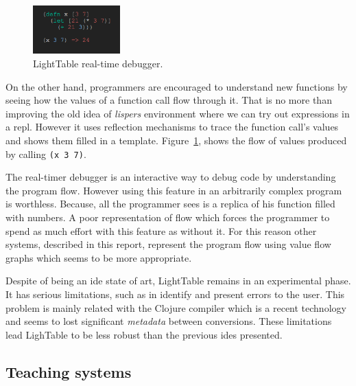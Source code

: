 \begin{figure}
  \vspace{-25pt}
  \begin{center}
    \includegraphics[width=0.3\textwidth]{img/eval-close}
  \end{center}
  \vspace{-20pt}
 \caption{LightTable real-time debugger.}  
  \vspace{-20pt}
    \label{fig:lt2}
\end{figure}

On the other hand, programmers are encouraged to understand new functions by seeing how the values of a function call flow through it. That is no more than improving the old idea of \textit{lispers} environment where we can try out expressions in a \ac{repl}. However it uses reflection mechanisms to trace the function call's values and shows them filled in a template. Figure~\ref{fig:lt2}, shows the flow of values produced by calling \texttt{(x 3 7)}.

The real-timer debugger is an interactive way to debug code by understanding the program flow. However using this feature in an arbitrarily complex program is worthless. Because, all the programmer sees is a replica of his function filled with numbers. A poor representation of flow which forces the programmer to spend as much effort with this feature as without it. For this reason other systems, described in this report, represent the program flow using value flow graphs which seems to be more appropriate.

Despite of being an \ac{ide} state of art, LightTable remains in an experimental phase. It has serious limitations, such as in identify and present errors to the user. This problem is mainly related with the Clojure compiler which is a recent technology and seems to lost significant \textit{metadata} between conversions. These limitations lead LighTable to be less robust than the previous \ac{ide}s presented.
\subsection{Teaching systems}

